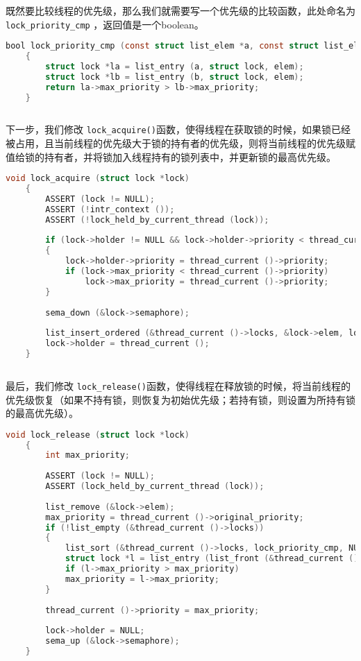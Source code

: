 \documentclass{article}
\begin{document}
	既然要比较线程的优先级，那么我们就需要写一个优先级的比较函数，此处命名为 \texttt{lock\_priority\_cmp} ，返回值是一个boolean。
	
	\begin{lstlisting}[language=C, title=锁的比较函数]
    bool lock_priority_cmp (const struct list_elem *a, const struct list_elem *b, void *aux UNUSED)
    {
    	struct lock *la = list_entry (a, struct lock, elem);
    	struct lock *lb = list_entry (b, struct lock, elem);
    	return la->max_priority > lb->max_priority;
    }
		
	\end{lstlisting}
	
	下一步，我们修改 \texttt{lock\_acquire()}函数，使得线程在获取锁的时候，如果锁已经被占用，且当前线程的优先级大于锁的持有者的优先级，则将当前线程的优先级赋值给锁的持有者，并将锁加入线程持有的锁列表中，并更新锁的最高优先级。
	
	\begin{lstlisting}[language=C, title=修改后的\texttt{lock\_acquire()}函数]
    void lock_acquire (struct lock *lock)
    {
    	ASSERT (lock != NULL);
    	ASSERT (!intr_context ());
    	ASSERT (!lock_held_by_current_thread (lock));
    	
    	if (lock->holder != NULL && lock->holder->priority < thread_current ()->priority)
    	{
    		lock->holder->priority = thread_current ()->priority;
    		if (lock->max_priority < thread_current ()->priority)
    		    lock->max_priority = thread_current ()->priority;
    	}
    	
    	sema_down (&lock->semaphore);
    	
    	list_insert_ordered (&thread_current ()->locks, &lock->elem, lock_priority_cmp, NULL);
    	lock->holder = thread_current ();
    }
		
	\end{lstlisting}
	
	最后，我们修改 \texttt{lock\_release()}函数，使得线程在释放锁的时候，将当前线程的优先级恢复（如果不持有锁，则恢复为初始优先级；若持有锁，则设置为所持有锁的最高优先级）。
	
	\begin{lstlisting}[language=C, title=修改后的\texttt{lock\_release()}函数]
    void lock_release (struct lock *lock) 
    {
    	int max_priority;
    	
    	ASSERT (lock != NULL);
    	ASSERT (lock_held_by_current_thread (lock));
    	
    	list_remove (&lock->elem);
    	max_priority = thread_current ()->original_priority;
    	if (!list_empty (&thread_current ()->locks))
    	{
    		list_sort (&thread_current ()->locks, lock_priority_cmp, NULL);
    		struct lock *l = list_entry (list_front (&thread_current ()->locks), struct lock, elem);
    		if (l->max_priority > max_priority)
    		max_priority = l->max_priority;
    	}
    	
    	thread_current ()->priority = max_priority;
    	
    	lock->holder = NULL;
    	sema_up (&lock->semaphore);
    }
		
	\end{lstlisting}
	
\end{document}
